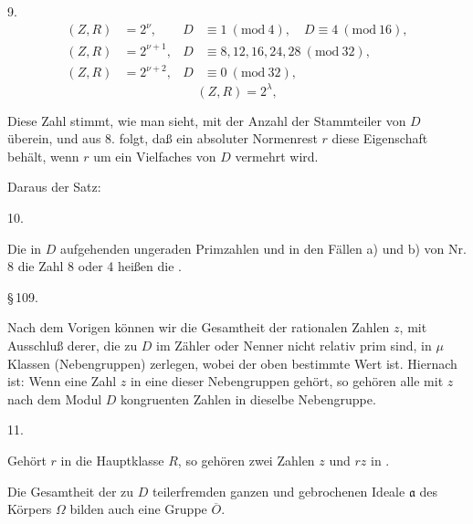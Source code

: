 9. 
\[
\begin{aligned}
(Z, R) &= 2^{\nu}, & D &\equiv 1 \ (\mathrm{mod}\ 4), \quad D \equiv 4 \ (\mathrm{mod}\ 16),\\
(Z, R) &= 2^{\nu+1}, & D &\equiv 8, 12, 16, 24, 28 \ (\mathrm{mod}\ 32),\\
(Z, R) &= 2^{\nu+2}, & D &\equiv 0 \ (\mathrm{mod}\ 32),
\end{aligned}
\]
\[
(Z, R) = 2^{\lambda},
\]

Diese Zahl stimmt, wie man sieht, mit der Anzahl der Stammteiler von $D$ überein, und aus 8. folgt, daß ein absoluter Normenrest $r$ diese Eigenschaft behält, wenn $r$ um ein Vielfaches von $D$ vermehrt wird.

Daraus der Satz:

10. 

Die in $D$ aufgehenden ungeraden Primzahlen und in den Fällen a) und b) von Nr. 8 die Zahl 8 oder 4 heißen die .

\begin{center}
\S\,109. 
\end{center}

Nach dem Vorigen können wir die Gesamtheit der rationalen Zahlen $z$, mit Ausschluß derer, die zu $D$ im Zähler oder Nenner nicht relativ prim sind, in $\mu$ Klassen (Nebengruppen) zerlegen, wobei
der oben bestimmte Wert ist. Hiernach ist:
Wenn eine Zahl $z$ in eine dieser Nebengruppen gehört, so gehören alle mit $z$ nach dem Modul $D$ kongruenten Zahlen in dieselbe Nebengruppe.

11. 

Gehört $r$ in die Hauptklasse $R$, so gehören zwei Zahlen $z$ und $rz$ in .

Die Gesamtheit der zu $D$ teilerfremden ganzen und gebrochenen Ideale $\mathfrak{a}$ des Körpers $\Omega$ bilden auch eine Gruppe $\overline{O}$.
